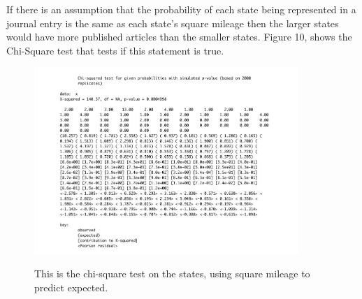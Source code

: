 \documentclass[12pt, letterpaper]{article}
\begin{document}
If there is an assumption that the probability of each state being represented in a journal entry is the same as each state's square mileage then the larger states would have more published articles than the smaller states. Figure 10, shows the Chi-Square test that tests if this statement is true. 
\begin{figure}[!h]
\begin{center}
\includegraphics[width=10cm]{chi-state.pdf}
\label{fig: Chi-Square Test: States}
\caption{This is the chi-square test on the states, using square mileage to predict expected.}
\end{center}
\end{figure}
\end{document}
